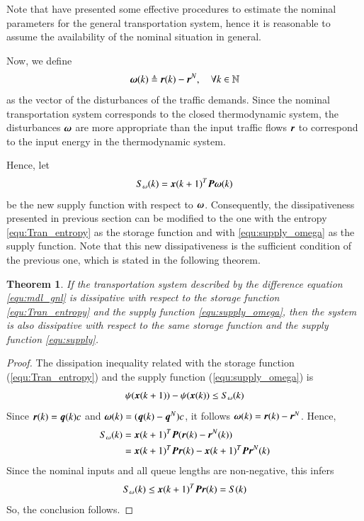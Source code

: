 \documentclass[preprint,authoryear,12pt]{elsarticle}
\renewcommand{\vec}[1]{\mbox{\boldmath$#1$}}
\newcommand{\mat}[1]{\mbox{\boldmath$#1$}}
\newtheorem{thm}{Theorem}
\begin{document}
Note that \citet{de_oliveira_multi-agent_2010} have presented some effective procedures to estimate the nominal parameters for the general transportation system, hence it is reasonable to assume the availability of the nominal situation in general.

Now, we define
\begin{equation}
\vec{\omega}(k)\triangleq\vec{r}(k)-\vec{r}^N, \quad \forall
k\in\mathbb{N}
\end{equation}
as the vector of the disturbances of the traffic demands. Since the nominal transportation system corresponds to the closed thermodynamic system, the disturbances $\vec{\omega}$ are more appropriate than the input traffic flows $\vec{r}$ to correspond to the input energy in the thermodynamic system.

Hence, let
\begin{equation}\label{equ:supply_omega}
  S_\omega(k) = \vec{x}(k+1)^T \mat{P} \vec{\omega}(k)
\end{equation}
be the new supply function with respect to $\vec{\omega}$. Consequently, the dissipativeness presented in previous section can be modified to the one with the entropy \eqref{equ:Tran_entropy} as the storage function and with \eqref{equ:supply_omega} as the supply function. Note that this new dissipativeness is the sufficient condition of the previous one, which is stated in the following theorem.

\begin{thm}
If the transportation system described by the difference equation \eqref{equ:mdl_gnl} is dissipative with respect to the storage function \eqref{equ:Tran_entropy} and the supply function \eqref{equ:supply_omega}, then the system is also dissipative with respect to the same storage function and the supply function \eqref{equ:supply}.
\end{thm}
\begin{proof}
The dissipation inequality related with the storage function (\ref{equ:Tran_entropy}) and the supply function
(\ref{equ:supply_omega}) is
\begin{equation}\label{equ:dissipative_omega}
  \psi(\vec{x}(k+1))-\psi(\vec{x}(k)) \leq S_\omega(k)
\end{equation}
Since $\vec{r}(k)=\vec{q}(k)c$ and $\vec{\omega}(k)=(\vec{q}(k)-\vec{q}^N)c$, it follows $\vec{\omega}(k)=\vec{r}(k)-\vec{r}^N$. Hence,
\begin{align*}
S_\omega(k) &= \vec{x}(k+1)^T \mat{P} (\vec{r}(k)-\vec{r}^N(k))\\
    &= \vec{x}(k+1)^T \mat{P} \vec{r}(k)-\vec{x}(k+1)^T \mat{P}
\vec{r}^N(k)
\end{align*}
Since the nominal inputs and all queue lengths are non-negative, this infers
$$S_\omega(k)\leq \vec{x}(k+1)^T \mat{P} \vec{r}(k) = S(k)$$
So, the conclusion follows.
\end{proof}
\end{document}
